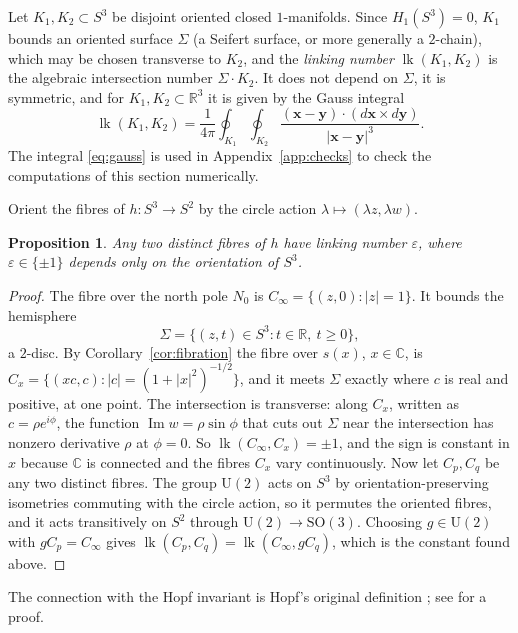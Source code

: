 \documentclass[11pt]{amsart}
\numberwithin{equation}{section}
\theoremstyle{plain}
\newtheorem{proposition}[theorem]{Proposition}
\theoremstyle{definition}
\theoremstyle{remark}
\newcommand{\R}{\mathbb{R}}
\newcommand{\C}{\mathbb{C}}
\newcommand{\SO}{\mathrm{SO}}
\newcommand{\U}{\mathrm{U}}
\newcommand{\lk}{\operatorname{lk}}
\newcommand{\Imag}{\operatorname{Im}}
\begin{document}
Let $K_1,K_2\subset S^3$ be disjoint oriented closed $1$-manifolds. Since $H_1(S^3)=0$, $K_1$ bounds an oriented surface $\Sigma$ (a Seifert surface, or more generally a $2$-chain), which may be chosen transverse to $K_2$, and the \emph{linking number} $\lk(K_1,K_2)$ is the algebraic intersection number $\Sigma\cdot K_2$. It does not depend on $\Sigma$, it is symmetric, and for $K_1,K_2\subset\R^3$ it is given by the Gauss integral
\begin{equation}\label{eq:gauss}
\lk(K_1,K_2)=\frac1{4\pi}\oint_{K_1}\oint_{K_2}\frac{(\mathbf x-\mathbf y)\cdot(d\mathbf x\times d\mathbf y)}{|\mathbf x-\mathbf y|^3}.
\end{equation}
The integral \eqref{eq:gauss} is used in Appendix~\ref{app:checks} to check the computations of this section numerically.

Orient the fibres of $h\colon S^3\to S^2$ by the circle action $\lambda\mapsto(\lambda z,\lambda w)$.

\begin{proposition}\label{prop:fibrelink}
Any two distinct fibres of $h$ have linking number $\varepsilon$, where $\varepsilon\in\{\pm1\}$ depends only on the orientation of $S^3$.
\end{proposition}

\begin{proof}
The fibre over the north pole $N_0$ is $C_\infty=\{(z,0):|z|=1\}$. It bounds the hemisphere
\[
\Sigma=\{(z,t)\in S^3:t\in\R,\ t\ge0\},
\]
a $2$-disc. By Corollary~\ref{cor:fibration} the fibre over $s(x)$, $x\in\C$, is $C_x=\{(xc,c):|c|=(1+|x|^2)^{-1/2}\}$, and it meets $\Sigma$ exactly where $c$ is real and positive, at one point. The intersection is transverse: along $C_x$, written as $c=\rho e^{i\phi}$, the function $\Imag w=\rho\sin\phi$ that cuts out $\Sigma$ near the intersection has nonzero derivative $\rho$ at $\phi=0$. So $\lk(C_\infty,C_x)=\pm1$, and the sign is constant in $x$ because $\C$ is connected and the fibres $C_x$ vary continuously. Now let $C_p,C_q$ be any two distinct fibres. The group $\U(2)$ acts on $S^3$ by orientation-preserving isometries commuting with the circle action, so it permutes the oriented fibres, and it acts transitively on $S^2$ through $\U(2)\to\SO(3)$. Choosing $g\in\U(2)$ with $gC_p=C_\infty$ gives $\lk(C_p,C_q)=\lk(C_\infty,gC_q)$, which is the constant found above.
\end{proof}

The connection with the Hopf invariant is Hopf's original definition \cite{Hop31}; see \cite[Section~17]{BT82} for a proof.
\end{document}
